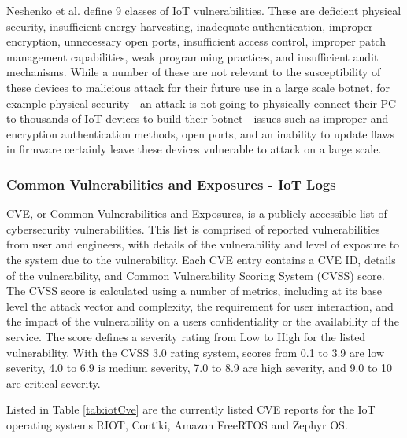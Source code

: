 Neshenko et al.\cite{neshenko_2019} define 9 classes of IoT vulnerabilities. These are
deficient physical security, insufficient energy harvesting, inadequate
authentication, improper encryption, unnecessary open ports, insufficient access
control, improper patch management capabilities, weak programming practices, and
insufficient audit mechanisms. While a number of these are not relevant to the
susceptibility of these devices to malicious attack for their future use in a
large scale botnet, for example physical security - an attack is not going to
physically connect their PC to thousands of IoT devices to build their botnet -
issues such as improper and encryption authentication methods, open ports, and
an inability to update flaws in firmware certainly leave these devices
vulnerable to attack on a large scale.

\subsubsection{Common Vulnerabilities and Exposures - IoT Logs}

CVE, or Common Vulnerabilities and Exposures, is a publicly accessible list of
cybersecurity vulnerabilities\cite{cveHome}. This list is comprised of reported
vulnerabilities from user and engineers, with details of the vulnerability and
level of exposure to the system due to the vulnerability. Each CVE entry
contains a CVE ID, details of the vulnerability, and Common Vulnerability
Scoring System (CVSS) score. The CVSS score is calculated using a number of
metrics, including at its base level the attack vector and complexity, the
requirement for user interaction, and the impact of the vulnerability on a users
confidentiality or the availability of the service\cite{nvdCalculator}. The
score defines a severity rating from Low to High for the listed vulnerability.
With the CVSS 3.0 rating system, scores from 0.1 to 3.9 are low severity, 4.0 to
6.9 is medium severity, 7.0 to 8.9 are high severity, and 9.0 to 10 are critical
severity.

Listed in Table \ref{tab:iotCve} are the currently listed CVE reports for the IoT
operating systems RIOT, Contiki, Amazon FreeRTOS and Zephyr OS.

